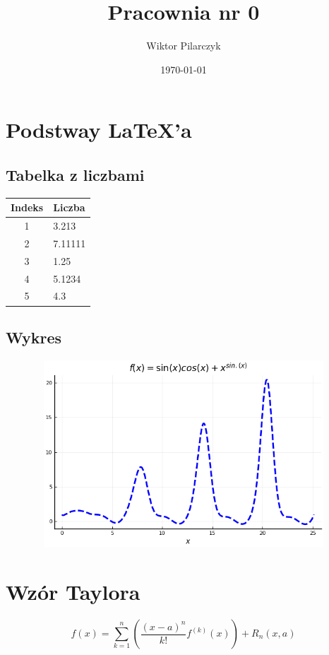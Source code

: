 \documentclass[a4paper]{article}
\author{{\large Wiktor Pilarczyk}}
\title{\Huge Pracownia nr 0}
\date{\today}
\begin{document}
\maketitle
\section{Podstway \LaTeX'a}

\subsection{Tabelka z liczbami}

\begin{center}
\begin{tabular}{|c|l|} \hline
Indeks & Liczba \\
\hline \hline
1 & 3.213\\
2 & 7.11111 \\
3 & 1.25 \\
4 & 5.1234 \\
5 & 4.3 \\
\hline
\end{tabular}
\end{center}

\subsection{Wykres}
\begin{figure}[h]
\centering
\includegraphics[width=12cm,height=7cm]{wykres.png}
\end{figure}
\section{Wzór Taylora}
\begin{equation}
f(x)= \sum_{k=1}^{n} \left(\frac{\left(x-a\right)^n}{k!}f^{(k)}(x) \right)+R_{n}(x,a)
\end{equation}
\thispagestyle{empty}
\end{document}
